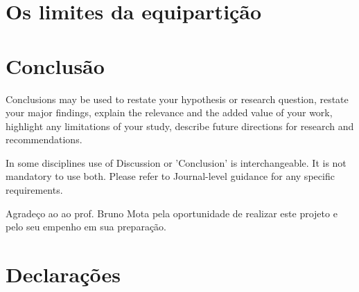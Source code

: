 \documentclass[pdflatex,sn-mathphys-num]{sn-jnl}%
\theoremstyle{thmstyleone}%
\theoremstyle{thmstyletwo}%
\theoremstyle{thmstylethree}%
\begin{document}
\section{Os limites da equipartição}\label{sec6}

\section*{Conclusão}

Conclusions may be used to restate your hypothesis or research question, restate your major findings, explain the relevance and the added value of your work, highlight any limitations of your study, describe future directions for research and recommendations. 

In some disciplines use of Discussion or 'Conclusion' is interchangeable. It is not mandatory to use both. Please refer to Journal-level guidance for any specific requirements.

\backmatter






Agradeço ao  ao prof. Bruno Mota pela oportunidade de realizar este projeto e pelo seu empenho em sua preparação.



\section*{Declarações}

\end{document}
